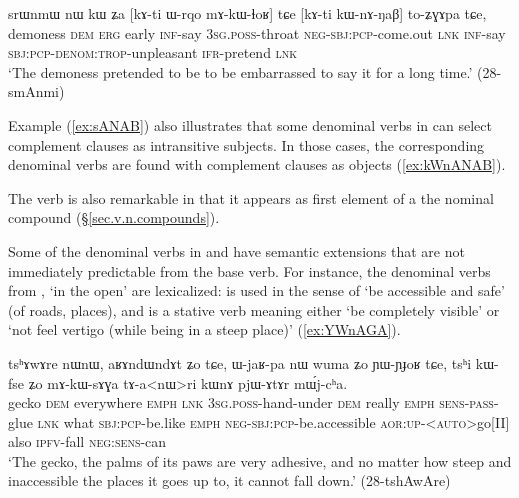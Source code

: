 \begin{exe}
\ex \label{ex:kWnANAB}
 \gll  srɯnmɯ nɯ kɯ ʑa [kɤ-ti ɯ-rqo mɤ-kɯ-ɬoʁ] tɕe [kɤ-ti kɯ-nɤ-ŋaβ] to-ʑɣɤpa tɕe, \\
demoness \textsc{dem} \textsc{erg} early \textsc{inf}-say \textsc{3sg}.\textsc{poss}-throat \textsc{neg}-\textsc{sbj}:\textsc{pcp}-come.out \textsc{lnk} \textsc{inf}-say \textsc{sbj}:\textsc{pcp}-\textsc{denom}:\textsc{trop}-unpleasant \textsc{ifr}-pretend \textsc{lnk} \\
\glt `The demoness pretended to be to be embarrassed to say it for a long time.' (28-smAnmi)
\end{exe}

Example (\ref{ex:sANAB})  also illustrates that some denominal verbs in  can select complement clauses as intransitive subjects. In those cases, the corresponding  denominal verbs are found with complement clauses as objects (\ref{ex:kWnANAB}).

The verb  is also remarkable in that it appears as first element of a the nominal compound   (§\ref{sec.v.n.compounds}). 
 
Some of the denominal verbs in  and  have semantic extensions that are not immediately predictable from the base verb. For instance, the denominal verbs from , `in the open'  are lexicalized:  is used in the sense of `be accessible and safe' (of roads, places), and  is a stative verb meaning either `be completely visible' or `not feel vertigo (while being in a steep place)' (\ref{ex:YWnAGA}).

\begin{exe}
\ex \label{ex:mAkWsAGa}
 \gll  tsʰɤwɤre nɯnɯ, aʁɤndɯndɤt ʑo tɕe, ɯ-jaʁ-pa nɯ wuma ʑo ɲɯ-ɲɟoʁ tɕe, tsʰi kɯ-fse ʑo mɤ-kɯ-sɤɣa tɤ-a<nɯ>ri kɯnɤ pjɯ-ɤtɤr mɯ́j-cʰa. \\
 gecko \textsc{dem} everywhere \textsc{emph} \textsc{lnk} \textsc{3sg}.\textsc{poss}-hand-under \textsc{dem} really \textsc{emph} \textsc{sens}-\textsc{pass}-glue \textsc{lnk} what \textsc{sbj}:\textsc{pcp}-be.like \textsc{emph} \textsc{neg}-\textsc{sbj}:\textsc{pcp}-be.accessible \textsc{aor}:\textsc{up}-<\textsc{auto}>go[II] also \textsc{ipfv}-fall \textsc{neg}:\textsc{sens}-can \\
\glt `The gecko, the palms of its paws are very adhesive, and no matter how steep and inaccessible the places it goes up to, it cannot fall down.' (28-tshAwAre)
 \end{exe}
 
